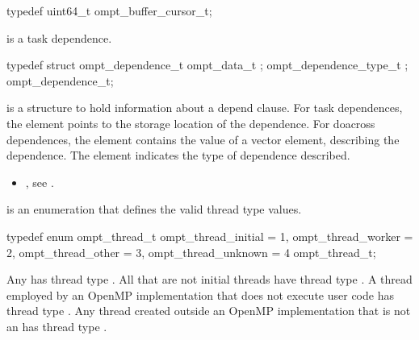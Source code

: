 \begin{ccppspecific}
\begin{omptOther}
typedef uint64_t ompt_buffer_cursor_t;
\end{omptOther}
\end{ccppspecific}





\label{sec:ompt_dependence_t}
 is a task dependence.


\begin{ccppspecific}
\begin{omptOther}
typedef struct ompt_dependence_t {
  ompt_data_t ;
  ompt_dependence_type_t ;
} ompt_dependence_t;
\end{omptOther}
\end{ccppspecific}


\descr
{} is a structure to hold information
about a depend clause.
For task dependences, the element  points to the storage location of the 
dependence. 
For doacross dependences, the element  contains the value of a vector 
element, describing 
the dependence.
The element  indicates the type of dependence described.

\crossreferences
\begin{itemize}
\item {}, see
.
\end{itemize}



\label{sec:ompt_thread_t}
 is an enumeration that defines the valid thread type values.


\begin{ccppspecific}
\begin{omptEnum}
typedef enum ompt_thread_t {
  ompt_thread_initial                 = 1,
  ompt_thread_worker                  = 2,
  ompt_thread_other                   = 3,
  ompt_thread_unknown                 = 4
} ompt_thread_t;
\end{omptEnum}
\end{ccppspecific}


Any  has thread type .
All  that are not initial threads have thread
type .  A thread employed by an OpenMP
implementation that does not execute user code has thread type
.  Any thread created outside an OpenMP
implementation that is not an  has thread type
.


